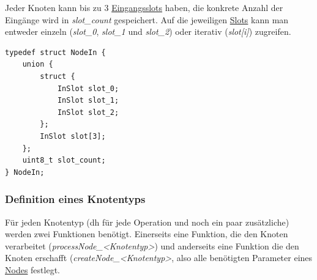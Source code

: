 \documentclass[oneside]{ausarbeitung}
\begin{document}
Jeder Knoten kann bis zu 3 \hyperref[lst:InSlot]{Eingangsslots} haben, die konkrete Anzahl der Eingänge wird in \textit{slot\_count} gespeichert. Auf die jeweiligen  \hyperref[lst:InSlot]{Slots} kann man entweder einzeln (\textit{slot\_0}, \textit{slot\_1} und \textit{slot\_2}) oder iterativ (\textit{slot[i]}) zugreifen.
\begin{lstlisting}[label={lst:NodeIn}, caption={NodeIn}]
typedef struct NodeIn {
    union {
        struct {
            InSlot slot_0;
            InSlot slot_1;
            InSlot slot_2;
        };
        InSlot slot[3];
    };
    uint8_t slot_count;
} NodeIn;
\end{lstlisting}

\subsubsection{Definition eines Knotentyps}
\label{subsub:node_type_definition}
Für jeden Knotentyp (\ac{dh} für jede Operation und noch ein paar zusätzliche) werden zwei Funktionen benötigt. Einerseits eine Funktion, die den Knoten verarbeitet (\textit{processNode\_<Knotentyp>}) und anderseits eine Funktion die den Knoten erschafft (\textit{createNode\_<Knotentyp>}, also alle benötigten Parameter eines \hyperref[lst:Node]{Nodes} festlegt.
\end{document}

